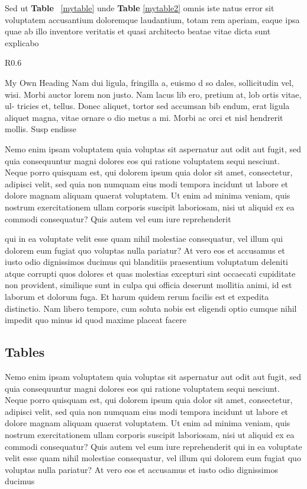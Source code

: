 \documentclass[12pt,a4paper]{report}
\begin{document}
Sed ut \textbf{Table} ~\ref{mytable} unde \textbf{Table} \ref{mytable2} omnis iste natus error sit voluptatem accusantium doloremque laudantium, totam rem aperiam, eaque ipsa quae ab illo inventore veritatis et quasi architecto beatae vitae dicta sunt explicabo
%
\begin{wrapfigure}{R}{0.6\textwidth}
	\begin{sidebar}{My Own Heading}
		Nam dui ligula, fringilla a, euismo d so dales, sollicitudin vel, wisi. Morbi auctor lorem non justo. Nam lacus lib ero, pretium at, lob ortis vitae, ul- tricies et, tellus. Donec aliquet, tortor sed accumsan bib endum, erat ligula aliquet magna, vitae ornare o dio metus a mi. Morbi ac orci et nisl hendrerit mollis. Susp endisse
	\end{sidebar}
\end{wrapfigure}
%
Nemo enim ipsam voluptatem quia voluptas sit aspernatur aut odit aut fugit, sed quia consequuntur magni dolores eos qui ratione voluptatem sequi nesciunt. Neque porro quisquam est, qui dolorem ipsum quia dolor sit amet, consectetur, adipisci velit, sed quia non numquam eius modi tempora incidunt ut labore et dolore magnam aliquam quaerat voluptatem. Ut enim ad minima veniam, quis nostrum exercitationem ullam corporis suscipit laboriosam, nisi ut aliquid ex ea commodi consequatur? Quis autem vel eum iure reprehenderit 

qui in ea voluptate velit esse quam nihil molestiae consequatur, vel illum qui dolorem eum fugiat quo voluptas nulla pariatur? At vero eos et accusamus et iusto odio dignissimos ducimus qui blanditiis praesentium voluptatum deleniti atque corrupti quos dolores et quas molestias excepturi sint occaecati cupiditate non provident, similique sunt in culpa qui officia deserunt mollitia animi, id est laborum et dolorum fuga. Et harum quidem rerum facilis est et expedita distinctio. Nam libero tempore, cum soluta nobis est eligendi optio cumque nihil impedit quo minus id quod maxime placeat facere
%
\subsection{Tables}
%
Nemo enim ipsam voluptatem quia voluptas sit aspernatur aut odit aut fugit, sed quia consequuntur magni dolores eos qui ratione voluptatem sequi nesciunt. Neque porro quisquam est, qui dolorem ipsum quia dolor sit amet, consectetur, adipisci velit, sed quia non numquam eius modi tempora incidunt ut labore et dolore magnam aliquam quaerat voluptatem. Ut enim ad minima veniam, quis nostrum exercitationem ullam corporis suscipit laboriosam, nisi ut aliquid ex ea commodi consequatur? Quis autem vel eum iure reprehenderit qui in ea voluptate velit esse quam nihil molestiae consequatur, vel illum qui dolorem eum fugiat quo voluptas nulla pariatur? At vero eos et accusamus et iusto odio dignissimos ducimus \\
\end{document}
